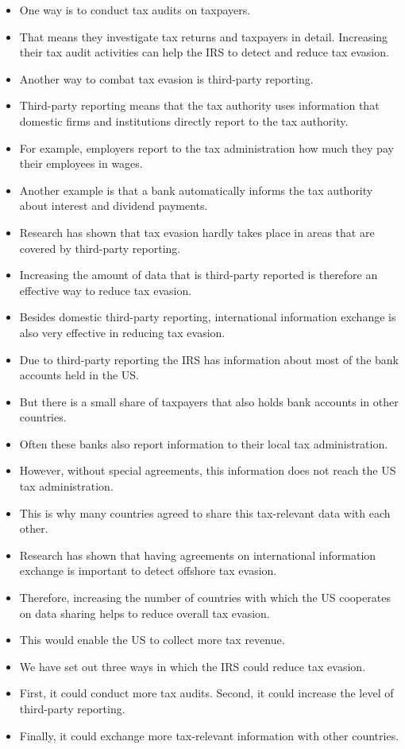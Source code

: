 \documentclass[11pt]{article}
\begin{document}
\begin{itemize}
\item One way is to conduct tax audits on taxpayers. 
\item That means they investigate tax returns and taxpayers in detail. Increasing their tax audit activities can help the IRS to detect and reduce tax evasion. 
\item Another way to combat tax evasion is third-party reporting. 
\item Third-party reporting means that the tax authority uses information that domestic firms and institutions directly report to the tax authority. 
\item For example, employers report to the tax administration how much they pay their employees in wages. 
\item Another example is that a bank automatically informs the tax authority about interest and dividend payments. 
\item Research has shown that tax evasion hardly takes place in areas that are covered by third-party reporting. 
\item Increasing the amount of data that is third-party reported is therefore an effective way to reduce tax evasion. 
\item Besides domestic third-party reporting, international information exchange is also very effective in reducing tax evasion. 
\item Due to third-party reporting the IRS has information about most of the bank accounts held in the US. 
\item But there is a small share of taxpayers that also holds bank accounts in other countries. 
\item Often these banks also report information to their local tax administration. 
\item However, without special agreements, this information does not reach the US tax administration. 
\item This is why many countries agreed to share this tax-relevant data with each other. 
\item Research has shown that having agreements on international information exchange is important to detect offshore tax evasion. 
\item Therefore, increasing the number of countries with which the US cooperates on data sharing helps to reduce overall tax evasion.
\item This would enable the US to collect more tax revenue.
\item We have set out three ways in which the IRS could reduce tax evasion.
\item First, it could conduct more tax audits. Second, it could increase the level of third-party reporting. 
\item Finally, it could exchange more tax-relevant information with other countries. 
\end{itemize}
\end{document}
